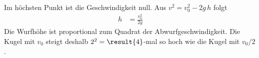 Im höchsten Punkt ist die Geschwindigkeit null. Aus $v^2 = v_0^2 - 2g\,h$ folgt
\begin{align}
 h &= \frac{v_0^2}{2g}
\end{align}
Die Wurfhöhe ist proportional zum Quadrat der Abwurfgeschwindigkeit. Die Kugel mit $v_0$ steigt deshalb $2^2 = \result{4}$-mal so hoch wie die Kugel mit $v_0/2$.

